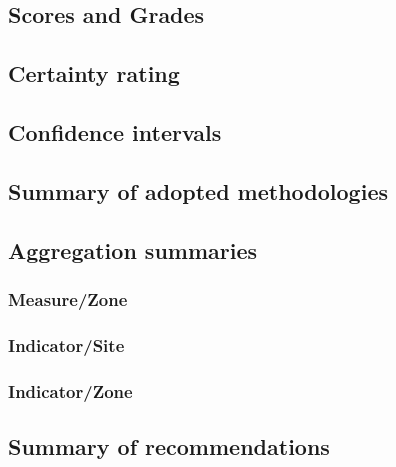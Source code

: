 \documentclass[a4paper]{AIMSreport}
\begin{document}
\subsection{Scores and Grades}
\subsection{Certainty rating}
\subsection{Confidence intervals}

\subsection{Summary of adopted methodologies}
\subsection{Aggregation summaries}
\subsubsection{Measure/Zone} 
\subsubsection{Indicator/Site}
\subsubsection{Indicator/Zone}

\subsection{Summary of recommendations}
 
~\\[2em]



\clearpage
\end{document}
